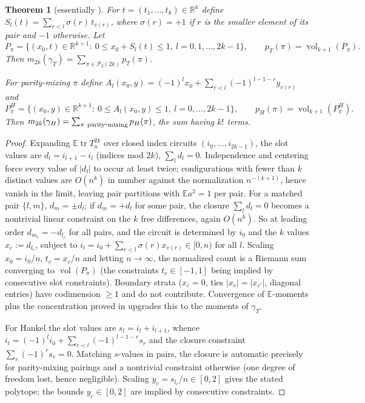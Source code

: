 ﻿\documentclass[11pt]{article}
\newtheorem{theorem}{Theorem}[section]
\theoremstyle{remark}
\newcommand{\E}{\mathbb{E}}
\newcommand{\R}{\mathbb{R}}
\newcommand{\vol}{\operatorname{vol}}
\newcommand{\PP}{\mathcal{P}_2}
\newcommand{\gT}{\gamma_T}
\newcommand{\gH}{\gamma_H}
\begin{document}
\begin{theorem}[essentially \cite{BDJ,HM}]\label{thm:volumes}
For $t=(t_1,\dots,t_k)\in\R^k$ define
$S_l(t)=\sum_{r<l}\sigma(r)\,t_{v(r)}$, where $\sigma(r)=+1$ if $r$ is the smaller
element of its pair and $-1$ otherwise. Let
\[
P_\pi=\Big\{(x_0,t)\in\R^{k+1}:\ 0\le x_0+S_l(t)\le 1,\ l=0,1,\dots,2k-1\Big\},
\qquad p_T(\pi)=\vol_{k+1}(P_\pi).
\]
Then $m_{2k}(\gT)=\sum_{\pi\in\PP(2k)}p_T(\pi)$.

For parity-mixing $\pi$ define
$A_l(x_0,y)=(-1)^l x_0+\sum_{r<l}(-1)^{l-1-r}y_{v(r)}$ and
\[
P^H_\pi=\Big\{(x_0,y)\in\R^{k+1}:\ 0\le A_l(x_0,y)\le 1,\ l=0,\dots,2k-1\Big\},
\qquad p_H(\pi)=\vol_{k+1}(P^H_\pi).
\]
Then $m_{2k}(\gH)=\sum_{\pi\ \mathrm{parity\hbox{-}mixing}}p_H(\pi)$, the sum having
$k!$ terms.
\end{theorem}

\begin{proof}
Expanding $\E\operatorname{tr} T_n^{2k}$ over closed index circuits
$(i_0,\dots,i_{2k-1})$, the slot values are $d_l=i_{l+1}-i_l$ (indices mod $2k$),
$\sum_l d_l=0$. Independence and centering force every value of $|d_l|$ to occur at
least twice; configurations with fewer than $k$ distinct values are $O(n^{k})$ in
number against the normalization $n^{-(k+1)}$, hence vanish in the limit, leaving pair
partitions with $\E a^2=1$ per pair. For a matched pair $\{l,m\}$, $d_m=\pm d_l$; if
$d_m=+d_l$ for some pair, the closure $\sum_l d_l=0$ becomes a nontrivial linear
constraint on the $k$ free differences, again $O(n^{k})$. So at leading order
$d_{m_c}=-d_{l_c}$ for all pairs, and the circuit is determined by $i_0$ and the $k$
values $x_c:=d_{l_c}$, subject to $i_l=i_0+\sum_{r<l}\sigma(r)x_{v(r)}\in[0,n)$ for all
$l$. Scaling $x_0=i_0/n$, $t_c=x_c/n$ and letting $n\to\infty$, the normalized count is
a Riemann sum converging to $\vol(P_\pi)$ (the constraints $t_c\in[-1,1]$ being implied
by consecutive slot constraints). Boundary strata ($x_c=0$, ties $|x_c|=|x_{c'}|$,
diagonal entries) have codimension $\ge1$ and do not contribute. Convergence of
$\E$-moments plus the concentration proved in \cite{BDJ} upgrades this to the moments
of $\gT$.

For Hankel the slot values are $s_l=i_l+i_{l+1}$, whence
$i_l=(-1)^l i_0+\sum_{r<l}(-1)^{l-1-r}s_r$ and the closure constraint
$\sum_r(-1)^r s_r=0$. Matching $s$-values in pairs, the closure is automatic precisely
for parity-mixing pairings and a nontrivial constraint otherwise (one degree of freedom
lost, hence negligible). Scaling $y_c=s_{l_c}/n\in[0,2]$ gives the stated polytope; the
bounds $y_c\in[0,2]$ are implied by consecutive constraints.
\end{proof}
\end{document}
